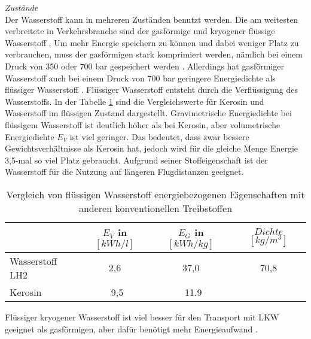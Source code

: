 %
\textit{Zustände}\\
Der Wasserstoff kann in mehreren Zuständen benutzt werden. Die am weitesten verbreitete in
Verkehrsbranche sind der gasförmige  und kryogener flüssige Wasserstoff . 
Um mehr Energie speichern zu können und dabei weniger Platz zu verbrauchen, muss der gasförmigen  stark komprimiert werden, 
nämlich bei einem Druck von 350 oder 700 bar gespeichert werden \cite{colpan2022fuel}.
Allerdings hat gasförmiger Wasserstoff auch bei einem Druck von 700 bar geringere Energiedichte
als flüssiger Wasserstoff \cite{eichlseder2012hydrogen}.
Flüssiger Wasserstoff entsteht durch die Verflüssigung des Wasserstoffs.
In der Tabelle \ref{wasserstoff_energie} sind die Vergleichswerte für Kerosin und Wasserstoff im flüssigen Zustand dargestellt.
Gravimetrische Energiedichte bei flüssigem Wasserstoff ist deutlich höher als bei Kerosin, aber volumetrische Energiedichte $E_V$ ist viel geringer.
Das bedeutet, dass  zwar bessere Gewichtsverhältnisse als Kerosin hat, jedoch wird für die gleiche Menge Energie 3,5-mal so viel Platz gebraucht.
Aufgrund seiner Stoffeigenschaft ist der Wasserstoff für die Nutzung auf längeren Flugdistanzen geeignet.
\begin{table}[h]
	\begin{center}
    \caption{Vergleich von flüssigen Wasserstoff energiebezogenen Eigenschaften mit anderen konventionellen Treibstoffen }
	\label{wasserstoff_energie}
	\begin{tabular}{|l|c|c|c|}
		\hline
		& \textbf{$E_V$ in $[kWh/l]$} & \textbf{$E_G$ in $[kWh/kg]$} & \textbf{$Dichte$ $[kg/m^3]$}  \\ \hline
		Wasserstoff LH2 & 2,6 \cite{colpan2022fuel} & 37,0 \cite{colpan2022fuel} & 70,8 \cite{eichlseder2012hydrogen}\\ \hline
		Kerosin & ~9,5 \cite{colpan2022fuel} & ~11.9 \cite{colpan2022fuel}&  \\ \hline
	\end{tabular}
    \end{center}
\end{table}

Flüssiger kryogener Wasserstoff ist viel besser für den Transport mit LKW geeignet als gasförmigen,
aber dafür benötigt mehr Energieaufwand \cite{colpan2022fuel}. 

